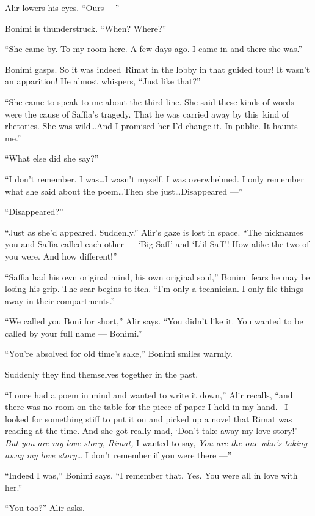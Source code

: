 \documentclass[twoside,11pt,openany]{book}
\begin{document}
Alir lowers his eyes. ``Ours ---''

Bonimi is thunderstruck. ``When? Where?''

``She came by. To my room here. A few days ago. I came in and there she was.''

Bonimi gasps. So it was indeed~Rimat in the lobby in that guided tour! It wasn't an apparition! He almost whispers,
``Just like that?''

``She came to speak to me about the third line. She said these kinds of words were the cause of Saffia's
tragedy. That he was carried away by this~kind of{ }rhetorics. She was wild{\ldots}And I promised her
I'd change it. In public. It haunts me.''

``What else did she say?''

``I don't remember. I was{\ldots}I wasn't myself. I was overwhelmed. I only remember what she said about
the poem{\ldots}Then she just{\ldots}Disappeared ---''

``Disappeared?''

``Just as she'd appeared. Suddenly.'' Alir's gaze is lost in space. ``The
nicknames you and Saffia called each other --- `Big-Saff' and `L'il-Saff'! How alike the two of you were. And how
different!''

``Saffia had his own original mind, his own original soul,'' Bonimi fears he may be losing his
grip. The scar begins to itch. ``I'm only a technician. I only file things away in their
compartments.''

``We called you Boni for short,'' Alir says. ``You didn't like it. You wanted to
be called by your full name --- Bonimi.''

``You're absolved for old time's sake,'' Bonimi smiles warmly.

Suddenly they find themselves together in the past.

``I once had a poem in mind and wanted to write it down,'' Alir recalls, ``and
there was no room on the table for the piece of paper I held in my hand. ~I looked for something stiff to put it on and
picked up a novel that Rimat was reading at the time. And she got really mad, `Don't take away my love story!'
\textit{But you are my love story, Rimat, }I wanted to say, \textit{You are the one who's taking away my love
story{\ldots}} I don't remember if you were there ---''

``Indeed I was,'' Bonimi says. ``I remember that. Yes. You were all in love with
her.''

``You too?'' Alir asks.
\end{document}
